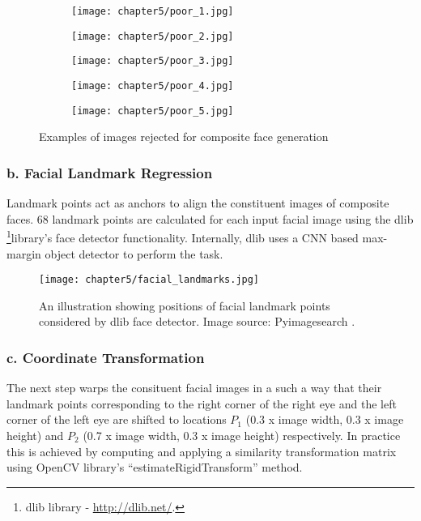 \documentclass[../report.tex]{subfiles}
\begin{document}
       \begin{figure}[H]
    	   	\centering
    	   	\begin{subfigure}[b]{0.17\textwidth}
    		   		\centering
    		   		\texttt{[image: chapter5/poor\_1.jpg]}
    		   	\end{subfigure}
    	   	\begin{subfigure}[b]{0.17\textwidth}
    		   		\centering
    		   		\texttt{[image: chapter5/poor\_2.jpg]}
    		   	\end{subfigure}
    	   		\begin{subfigure}[b]{0.17\textwidth}
    	   		\centering
    	   		\texttt{[image: chapter5/poor\_3.jpg]}
    	   	\end{subfigure}
       		\begin{subfigure}[b]{0.17\textwidth}
       			\centering
       			\texttt{[image: chapter5/poor\_4.jpg]}
       		\end{subfigure}
       			\begin{subfigure}[b]{0.17\textwidth}
       			\centering
       			\texttt{[image: chapter5/poor\_5.jpg]}
       		\end{subfigure}
    	   	\caption{Examples of images rejected for composite face generation}
    	   	\label{fig_gmdb_poorq}
    	   \end{figure}
    \subsubsection{b. Facial Landmark Regression}
    Landmark points act as anchors to align the constituent images of composite faces. 68 landmark points are calculated for each input facial image using the dlib \footnote{dlib library - \url{http://dlib.net/}.}library's face detector functionality. Internally, dlib uses a CNN based max-margin object detector to perform the task.
        \begin{figure}[H]
        \centering
    	\hspace*{0cm}      
    	\texttt{[image: chapter5/facial\_landmarks.jpg]}
    	\caption{An illustration showing positions of facial landmark points considered by dlib face detector. Image source: Pyimagesearch \protect\footnotemark.}
    	\label{fig_gm_pipeline}
    \end{figure}
    \subsubsection{c. Coordinate Transformation}
    The next step warps the consituent facial images in a such a way that their landmark points corresponding to the right corner of the right eye and the left corner of the left eye are shifted to locations $P_{1}$ (0.3 x image width, 0.3 x image height) and $P_{2}$ (0.7 x image width, 0.3 x image height) respectively. In practice this is achieved by computing and applying a similarity transformation matrix using OpenCV library's \enquote{estimateRigidTransform} method.
    
\end{document}
